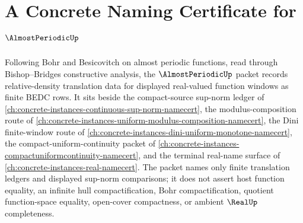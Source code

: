 \chapter{A Concrete Naming Certificate for $\AlmostPeriodicUp$}
\label{ch:concrete-instances-almost-periodic-namecert}

Following Bohr and Besicovitch on almost periodic functions, read through Bishop--Bridges constructive analysis, the $\AlmostPeriodicUp$ packet records relative-density translation data for displayed real-valued function windows as finite BEDC rows. It sits beside the compact-source sup-norm ledger of \autoref{ch:concrete-instances-continuous-sup-norm-namecert}, the modulus-composition route of \autoref{ch:concrete-instances-uniform-modulus-composition-namecert}, the Dini finite-window route of \autoref{ch:concrete-instances-dini-uniform-monotone-namecert}, the compact-uniform-continuity packet of \autoref{ch:concrete-instances-compactuniformcontinuity-namecert}, and the terminal real-name surface of \autoref{ch:concrete-instances-real-namecert}. The packet names only finite translation ledgers and displayed sup-norm comparisons; it does not assert host function equality, an infinite hull compactification, Bohr compactification, quotient function-space equality, open-cover compactness, or ambient $\RealUp$ completeness.

